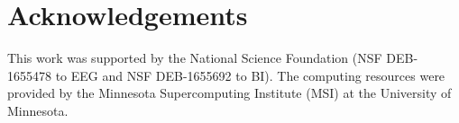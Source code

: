 \documentclass[11pt]{article}
\begin{document}
\section{Acknowledgements}

This work was supported by the National Science Foundation (NSF DEB-1655478 to EEG and NSF DEB-1655692 to BI).  The computing resources were provided by the Minnesota Supercomputing Institute (MSI) at the University of Minnesota.


\clearpage


\setstretch{\stretchby}
\end{document}
